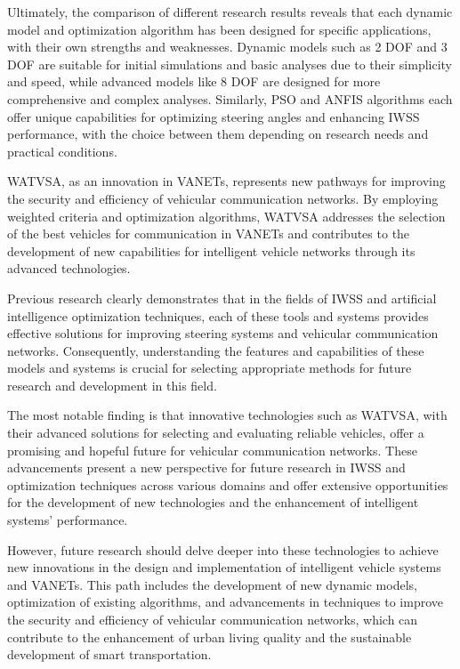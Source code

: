 \documentclass[a4paper,10pt]{article}
\begin{document}
        Ultimately, the comparison of different research results reveals that each dynamic model and optimization algorithm has been designed for specific applications, with their own strengths and weaknesses. Dynamic models such as 2 DOF and 3 DOF are suitable for initial simulations and basic analyses due to their simplicity and speed, while advanced models like 8 DOF are designed for more comprehensive and complex analyses. Similarly, PSO and ANFIS algorithms each offer unique capabilities for optimizing steering angles and enhancing IWSS performance, with the choice between them depending on research needs and practical conditions.
    
        WATVSA, as an innovation in VANETs, represents new pathways for improving the security and efficiency of vehicular communication networks. By employing weighted criteria and optimization algorithms, WATVSA addresses the selection of the best vehicles for communication in VANETs and contributes to the development of new capabilities for intelligent vehicle networks through its advanced technologies.
    
        Previous research clearly demonstrates that in the fields of IWSS and artificial intelligence optimization techniques, each of these tools and systems provides effective solutions for improving steering systems and vehicular communication networks. Consequently, understanding the features and capabilities of these models and systems is crucial for selecting appropriate methods for future research and development in this field.
    
        The most notable finding is that innovative technologies such as WATVSA, with their advanced solutions for selecting and evaluating reliable vehicles, offer a promising and hopeful future for vehicular communication networks. These advancements present a new perspective for future research in IWSS and optimization techniques across various domains and offer extensive opportunities for the development of new technologies and the enhancement of intelligent systems' performance.
    
        However, future research should delve deeper into these technologies to achieve new innovations in the design and implementation of intelligent vehicle systems and VANETs. This path includes the development of new dynamic models, optimization of existing algorithms, and advancements in techniques to improve the security and efficiency of vehicular communication networks, which can contribute to the enhancement of urban living quality and the sustainable development of smart transportation.
\end{document}
